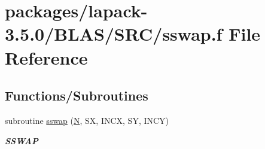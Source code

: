 \hypertarget{lapack-3_85_80_2BLAS_2SRC_2sswap_8f}{}\section{packages/lapack-\/3.5.0/\+B\+L\+A\+S/\+S\+R\+C/sswap.f File Reference}
\label{lapack-3_85_80_2BLAS_2SRC_2sswap_8f}
\subsection*{Functions/\+Subroutines}
\begin{DoxyCompactItemize}
\item 
subroutine \hyperlink{group__single__blas__level1_ga0a2eaca94b4941dbc351157126cbb0f6}{sswap} (\hyperlink{polmisc_8c_a0240ac851181b84ac374872dc5434ee4}{N}, S\+X, I\+N\+C\+X, S\+Y, I\+N\+C\+Y)
\begin{DoxyCompactList}\small\item\em {\bfseries S\+S\+W\+A\+P} \end{DoxyCompactList}\end{DoxyCompactItemize}
